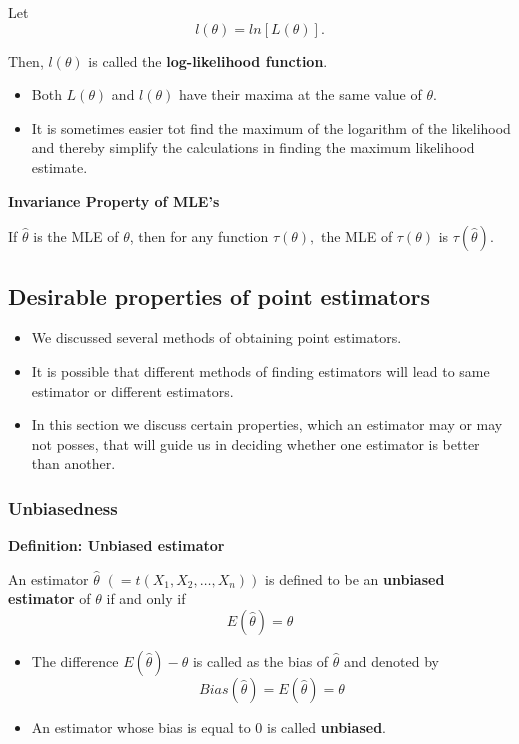 \documentclass[]{book}
\providecommand{\tightlist}{%
  \setlength{\itemsep}{0pt}\setlength{\parskip}{0pt}}
\begin{document}
Let \[l(\theta) = ln[L(\theta)].\]

Then, \(l(\theta)\) is called the \textbf{log-likelihood function}.

\begin{itemize}
\tightlist
\item
  Both \(L(\theta)\) and \(l(\theta)\) have their maxima at the same value of \(\theta\).
\item
  It is sometimes easier tot find the maximum of the logarithm of the likelihood and thereby simplify the calculations in finding the maximum likelihood estimate.
\end{itemize}

\textbf{Invariance Property of MLE's}

If \(\hat{\theta}\) is the MLE of \(\theta\), then for any function \(\tau(\theta),\) the MLE of \(\tau(\theta)\) is \(\tau(\hat{\theta}).\)

\newpage

\hypertarget{desirable-properties-of-point-estimators}{%
\subsection{Desirable properties of point estimators}\label{desirable-properties-of-point-estimators}}

\begin{itemize}
\item
  We discussed several methods of obtaining point estimators.
\item
  It is possible that different methods of finding estimators will lead to same estimator or different estimators.
\item
  In this section we discuss certain properties, which an estimator may or may not posses, that will guide us in deciding whether one estimator is better than another.
\end{itemize}

\hypertarget{unbiasedness}{%
\subsubsection{Unbiasedness}\label{unbiasedness}}

\textbf{Definition: Unbiased estimator}

An estimator \(\hat{\theta}\) \((=t(X_1, X_2, \dots, X_n))\) is defined to be an \textbf{unbiased estimator} of \(\theta\) if and only if
\[E(\hat{\theta}) = \theta\]

\begin{itemize}
\item
  The difference \(E(\hat{\theta}) -\theta\) is called as the bias of \(\hat{\theta}\) and denoted by
  \[Bias(\hat{\theta}) = E(\hat{\theta}) = \theta \]
\item
  An estimator whose bias is equal to 0 is called \textbf{unbiased}.
\end{itemize}
\end{document}

